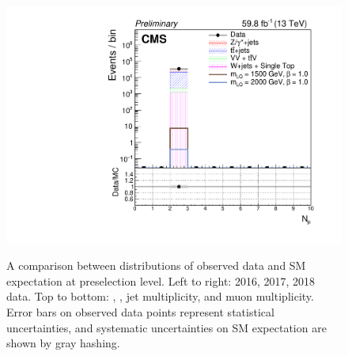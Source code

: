 \begin{figure}[H]
       {\includegraphics[width=.32\textwidth]{Images/Analysis/Results_2018_Unblinded/Plots/Preselection/BasicLQ_uujj_MuonCount_standard.pdf}}
       \caption{A comparison between distributions of observed data and SM expectation at preselection level. Left to right: 2016, 2017, 2018 data. Top to bottom: \ST, \ptmiss, jet multiplicity, and muon multiplicity. Error bars on observed data points represent statistical uncertainties, and systematic uncertainties on SM expectation are shown by gray hashing.}
    \label{figapp:preselmisc}
\end{figure}

